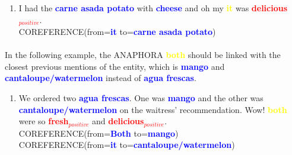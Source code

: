 \documentclass{article}
\begin{document}
	
	
	


\begin{enumerate}[resume]
	\item I had the \textbf{\textcolor{blue}{carne asada potato}} with \textbf{\textcolor{blue}{cheese}} and oh my \textbf{\textcolor{yellow}{it}} was \textbf{\textcolor{red}{delicious$_{positive}$}}.\\
	
	
	\textsc{COREFERENCE}(from=\textbf{\textcolor{blue}{it}} to=\textbf{\textcolor{blue}{carne asada potato}}) \\
\end{enumerate}

\paragraph{}
In the following example, the ANAPHORA \textbf{\textcolor{yellow}{both}} should be linked with the closest previous mentions of the entity, which is \textbf{\textcolor{blue}{mango}} and \textbf{\textcolor{blue}{cantaloupe/watermelon}} instead of \textbf{\textcolor{blue}{agua frescas}}.

\begin{enumerate}[resume]
	\item We ordered two \textbf{\textcolor{blue}{agua frescas}}. One was  \textbf{\textcolor{blue}{mango}} and the other was 
	\textbf{\textcolor{blue}{cantaloupe/watermelon}} on the waitress' recommendation. Wow! 
	\textbf{\textcolor{yellow}{both}} were so 
	\textbf{\textcolor{red}{fresh$_{positive}$}} and 
	\textbf{\textcolor{red}{delicious$_{positive}$}}.
	\\
	

	\textsc{COREFERENCE}(from=\textbf{\textcolor{blue}{Both}} to=\textbf{\textcolor{blue}{mango}}) \\
	\textsc{COREFERENCE}(from=\textbf{\textcolor{blue}{it}} to=\textbf{\textcolor{blue}{cantaloupe/watermelon}}) \\
	
\end{enumerate}
\end{document}
